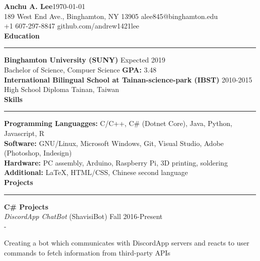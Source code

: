 \documentclass[11pt]{article}
\newcommand{\Hrule}{\vspace{1mm}\hrule\vspace{1mm}}
\begin{document}
    \noindent\Large\textbf{Anchu A. Lee}\hfill \small\today\\
    \noindent\small{189 West End Ave., Binghamton, NY 13905} \hfill \small{alee845@binghamton.edu}\\
    \noindent\small{+1 607-297-8847}\hfill\small{ github.com/andrew1421lee}
    \vspace{2mm}\\
    \noindent\large\textbf{Education}
    \Hrule
        \indent \small\textbf{Binghamton University (SUNY)} \hfill \small{Expected 2019}\indent\\
            \indent\indent\small{Bachelor of Science, Compuer Science \textbar \textbf{ GPA:} 3.48}\vspace{1mm}\\
        \indent \small\textbf{International Bilingual School at Tainan-science-park (IBST)} \hfill \small{2010-2015}\indent\\
            \indent\indent \small{High School Diploma } \hfill \small{Tainan, Taiwan}\indent\vspace{1mm}\\
    \noindent\large\textbf{Skills}
    \Hrule
        \indent \small\textbf{Programming Languagges: }\small{C/C++, C\# (Dotnet Core), Java, Python, Javascript, R}\vspace{0.5mm} \\
        \indent \small\textbf{Software: }\small{GNU/Linux, Microsoft Windows, Git, Visual Studio, Adobe (Photoshop, Indesign)}\vspace{0.5mm}\\
        \indent \small\textbf{Hardware: }\small{PC assembly, Arduino, Raspberry Pi, 3D printing, soldering}\vspace{0.5mm}\\
        \indent \small\textbf{Additional: }\small{LaTeX, HTML/CSS, Chinese second language}\vspace{1mm}\\
    \noindent\large\textbf{Projects}
    \Hrule
        \indent \small\textbf{C\# Projects}\\
            \indent\indent \small\textit{DiscordApp ChatBot}\small{ (ShavisiBot)} \hfill \small{Fall 2016-Present}\indent\vspace{0.5mm}\\
                \indent\indent\indent - \begin{minipage}{\dimexpr\textwidth-7cm}
                    \small{ Creating a bot which communicates with DiscordApp servers and reacts to user commands to fetch information from third-party APIs}
                \end{minipage}\vspace{1mm}\\
\end{document}
